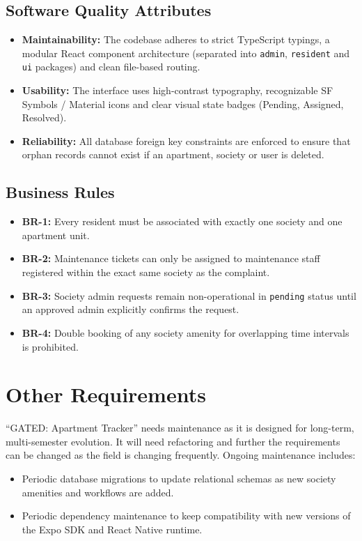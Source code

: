 \documentclass[a4paper,10pt]{scrartcl}
\numberwithin{figure}{section}
\newcommand{\code}[1]{\texttt{\renewcommand{\_}{\textunderscore\hspace{0pt}}#1}}
\begin{document}
\subsection{Software Quality Attributes}
\begin{itemize}
\item \textbf{Maintainability:} The codebase adheres to strict TypeScript typings, a modular React component architecture (separated into \code{admin}, \code{resident} and \code{ui} packages) and clean file-based routing.
\item \textbf{Usability:} The interface uses high-contrast typography, recognizable SF Symbols / Material icons and clear visual state badges (Pending, Assigned, Resolved).
\item \textbf{Reliability:} All database foreign key constraints are enforced to ensure that orphan records cannot exist if an apartment, society or user is deleted.
\end{itemize}

\subsection{Business Rules}
\begin{itemize}
\item \textbf{BR-1:} Every resident must be associated with exactly one society and one apartment unit.
\item \textbf{BR-2:} Maintenance tickets can only be assigned to maintenance staff registered within the exact same society as the complaint.
\item \textbf{BR-3:} Society admin requests remain non-operational in \code{pending} status until an approved admin explicitly confirms the request.
\item \textbf{BR-4:} Double booking of any society amenity for overlapping time intervals is prohibited.
\end{itemize}

\newpage
\section{Other Requirements}
``GATED: Apartment Tracker'' needs maintenance as it is designed for long-term, multi-semester evolution. It will need refactoring and further the requirements can be changed as the field is changing frequently. Ongoing maintenance includes:
\begin{itemize}
\item Periodic database migrations to update relational schemas as new society amenities and workflows are added.
\item Periodic dependency maintenance to keep compatibility with new versions of the Expo SDK and React Native runtime.
\end{itemize}
\end{document}
